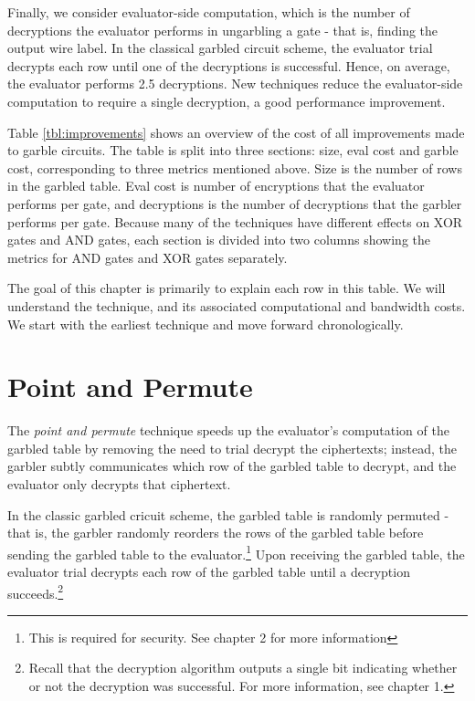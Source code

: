 Finally, we consider evaluator-side computation, which is the number of decryptions the evaluator performs in ungarbling a gate - that is, finding the output wire label.
In the classical garbled circuit scheme, the evaluator trial decrypts each row until one of the decryptions is successful.
Hence, on average, the evaluator performs 2.5 decryptions.
New techniques reduce the evaluator-side computation to require a single decryption, a good performance improvement.



Table \ref{tbl:improvements} shows an overview of the cost of all improvements made to garble circuits.
The table is split into three sections: size, eval cost and garble cost, corresponding to three metrics mentioned above.
Size is the number of rows in the garbled table.
Eval cost is number of encryptions that the evaluator performs per gate, and decryptions is the number of decryptions that the garbler performs per gate.
Because many of the techniques have different effects on XOR gates and AND gates, each section is divided into two columns showing the metrics for AND gates and XOR gates separately.

The goal of this chapter is primarily to explain each row in this table.
We will understand the technique, and its associated computational and bandwidth costs.
We start with the earliest technique and move forward chronologically.


\section{Point and Permute}

The \textit{point and permute} technique speeds up the evaluator's computation of the garbled table by removing the need to trial decrypt the ciphertexts; instead, the garbler subtly communicates which row of the garbled table to decrypt, and the evaluator only decrypts that ciphertext.

In the classic garbled cricuit scheme, the garbled table is randomly permuted - that is, the garbler randomly reorders the rows of the garbled table before sending the garbled table to the evaluator.\footnote{This is required for security. See chapter 2 for more information}
Upon receiving the garbled table, the evaluator trial decrypts each row of the garbled table until a decryption succeeds.\footnote{Recall that the decryption algorithm outputs a single bit indicating whether or not the decryption was successful. For more information, see chapter 1.}

